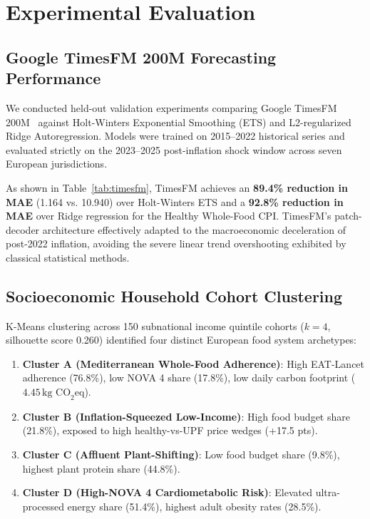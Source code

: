 \documentclass[journal,10pt,twocolumn]{article}
\begin{document}
\section{Experimental Evaluation}

\subsection{Google TimesFM 200M Forecasting Performance}
We conducted held-out validation experiments comparing Google TimesFM 200M~\cite{das2024timesfm} against Holt-Winters Exponential Smoothing (ETS) and L2-regularized Ridge Autoregression. Models were trained on 2015--2022 historical series and evaluated strictly on the 2023--2025 post-inflation shock window across seven European jurisdictions.

As shown in Table~\ref{tab:timesfm}, TimesFM achieves an \textbf{89.4\% reduction in MAE} (1.164 vs. 10.940) over Holt-Winters ETS and a \textbf{92.8\% reduction in MAE} over Ridge regression for the Healthy Whole-Food CPI. TimesFM’s patch-decoder architecture effectively adapted to the macroeconomic deceleration of post-2022 inflation, avoiding the severe linear trend overshooting exhibited by classical statistical methods.

\subsection{Socioeconomic Household Cohort Clustering}
K-Means clustering across 150 subnational income quintile cohorts ($k=4$, silhouette score 0.260) identified four distinct European food system archetypes:
\begin{enumerate}
    \item \textbf{Cluster A (Mediterranean Whole-Food Adherence)}: High EAT-Lancet adherence (76.8\%), low NOVA 4 share (17.8\%), low daily carbon footprint ($4.45\,\text{kg CO}_2\text{eq}$).
    \item \textbf{Cluster B (Inflation-Squeezed Low-Income)}: High food budget share (21.8\%), exposed to high healthy-vs-UPF price wedges (+17.5 pts).
    \item \textbf{Cluster C (Affluent Plant-Shifting)}: Low food budget share (9.8\%), highest plant protein share (44.8\%).
    \item \textbf{Cluster D (High-NOVA 4 Cardiometabolic Risk)}: Elevated ultra-processed energy share (51.4\%), highest adult obesity rates (28.5\%).
\end{enumerate}
\end{document}
